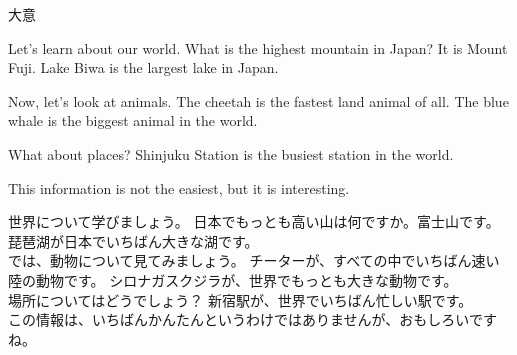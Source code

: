 \documentclass[aspectratio=169,xcolor={dvipsnames,table}]{beamer}
\begin{document}
\begin{frame}[plain,t]

\end{frame}
\begin{frame}[plain]{大意}
 
\begin{tcolorbox}
\parindent=15pt

\noindent{}
Let's learn about our world.
What is the highest mountain in Japan?
It is Mount Fuji.
Lake Biwa is the largest lake in Japan.

Now, let's look at animals.
The cheetah is the fastest land animal of all.
The blue whale is the biggest animal in the world.

What about places?
Shinjuku Station is the busiest station in the world.

This information is not the easiest, but it is interesting.
\end{tcolorbox}

\vspace{5pt}
\small

\zw
世界について学びましょう。
日本でもっとも高い山は何ですか。富士山です。 琵琶湖が日本でいちばん大きな湖です。\\
では、動物について見てみましょう。 チーターが、すべての中でいちばん速い陸の動物です。 シロナガスクジラが、世界でもっとも大きな動物です。\\
場所についてはどうでしょう？ 新宿駅が、世界でいちばん忙しい駅です。\\
この情報は、いちばんかんたんというわけではありませんが、おもしろいですね。
\end{frame}
\end{document}
